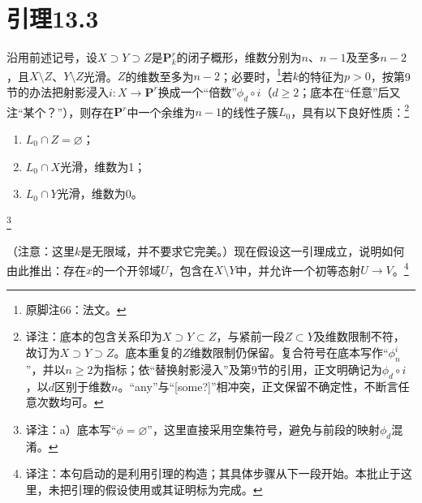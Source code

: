 \documentclass[openany,fontset=fandol]{ctexbook}
\newcommand{\note}[1]{\footnote{译注：#1}}
\begin{document}
\chapter*{引理13.3}
沿用前述记号，设$X\supset Y\supset Z$是$\mathbf P^r_k$的闭子概形，维数分别为$n$、$n-1$及至多$n-2$，且$X\setminus Z$、$Y\setminus Z$光滑。$Z$的维数至多为$n-2$；必要时，\footnote{原脚注66：法文。}若$k$的特征为$p>0$，按第9节的办法把射影浸入$i\colon X\to\mathbf P^r$换成一个“倍数”$\phi_d\circ i$（$d\geq2$；底本在“任意”后又注“某个？”），则存在$\mathbf P^r$中一个余维为$n-1$的线性子簇$L_0$，具有以下良好性质：\note{底本的包含关系印为$X\supset Y\subset Z$，与紧前一段$Z\subset Y$及维数限制不符，故订为$X\supset Y\supset Z$。底本重复的$Z$维数限制仍保留。复合符号在底本写作“$\phi_n^{i}$”，并以$n\geq2$为指标；依“替换射影浸入”及第9节的引用，正文明确记为$\phi_d\circ i$，以$d$区别于维数$n$。“any”与“[some?]”相冲突，正文保留不确定性，不断言任意次数均可。}
\begin{enumerate}
\item[a)] $L_0\cap Z=\varnothing$；
\item[b)] $L_0\cap X$光滑，维数为1；
\item[c)] $L_0\cap Y$光滑，维数为0。
\end{enumerate}
\note{a）底本写“$\phi=\varnothing$”，这里直接采用空集符号，避免与前段的映射$\phi_d$混淆。}

（注意：这里$k$是无限域，并不要求它完美。）现在假设这一引理成立，说明如何由此推出：存在$x$的一个开邻域$U$，包含在$X\setminus Y$中，并允许一个初等态射$U\to V$。\note{本句启动的是利用引理的构造；其具体步骤从下一段开始。本批止于这里，未把引理的假设使用或其证明标为完成。}
\end{document}
